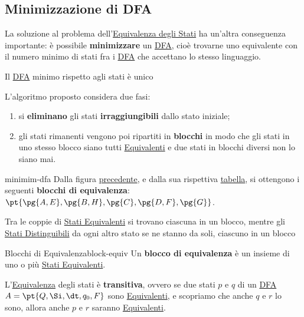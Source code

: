 \subsection{Minimizzazione di DFA}\label{sub:lr_minimizzazione_di_dfa} %
La soluzione al problema dell'\hyperref[sub:lr_equivalenza_degli_stati]{Equivalenza degli Stati} ha un'altra conseguenza importante: è possibile \textbf{minimizzare} un \hyperref[sub:lr_dfa]{DFA}, cioè trovarne uno equivalente con il numero minimo di stati fra i \hyperref[sub:lr_dfa]{DFA} che accettano lo stesso linguaggio.
\begin{note}
    Il \hyperref[sub:lr_dfa]{DFA} minimo rispetto agli stati è unico
\end{note}
L'algoritmo proposto considera due fasi:
\begin{enumerate}
    \item si \textbf{eliminano} gli stati \textbf{irraggiungibili} dallo stato iniziale;
    \item gli stati rimanenti vengono poi ripartiti in \textbf{blocchi} in modo che gli stati in uno stesso blocco siano tutti \hyperref[th:stati-equiv]{Equivalenti} e due stati in blocchi diversi non lo siano mai.
\end{enumerate}
\begin{example}{}{minimim-dfa}
    Dalla figura \hyperref[fig:20261009_133731]{precedente}, e dalla sua rispettiva \hyperref[fig:20261013_174544]{tabella}, si ottengono i seguenti \textbf{blocchi di equivalenza}: $\pt{\pg{A,E}, \pg{B,H}, \pg{C}, \pg{D,F}, \pg{G}}$.
    \begin{note}
        Tra le coppie di \hyperref[th:stati-equiv]{Stati Equivalenti} si trovano ciascuna in un blocco, mentre gli \hyperref[th:stati-distin]{Stati Distinguibili} da ogni altro stato se ne stanno da soli, ciascuno in un blocco
    \end{note}
\end{example}
\begin{definition}{Blocchi di Equivalenza}{block-equiv}
    Un \textbf{blocco di equivalenza} è un insieme di uno o più \hyperref[th:stati-equiv]{Stati Equivalenti}.
\end{definition}
\begin{theorem}{}{}
    L'\hyperref[th:stati-equiv]{Equivalenza} degli stati è \textbf{transitiva}, ovvero se due stati $p$ e $q$ di un \hyperref[sub:lr_dfa]{DFA} $A = \pt{Q,\Si,\dt,q_0,F}$ sono \hyperref[th:stati-equiv]{Equivalenti}, e scopriamo che anche $q$ e $r$ lo sono, allora anche $p$ e $r$ saranno \hyperref[th:stati-equiv]{Equivalenti}.
\end{theorem}
